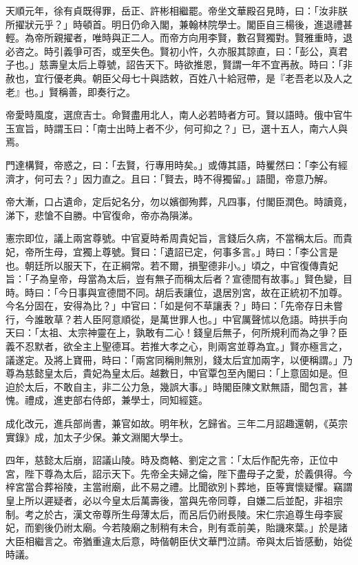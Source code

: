 \begin{pinyinscope}
天順元年，徐有貞既得罪，岳正、許彬相繼罷。帝坐文華殿召見時，曰：「汝非朕所擢狀元乎？」時頓首。明日仍命入閣，兼翰林院學士。閣臣自三楊後，進退禮甚輕。為帝所親擢者，唯時與正二人。而帝方向用李賢，數召賢獨對。賢雅重時，退必咨之。時引義爭可否，或至失色。賢初小忤，久亦服其諒直，曰：「彭公，真君子也。」慈壽皇太后上尊號，詔告天下。時欲推恩，賢謂一年不宜再赦。時曰：「非赦也，宜行優老典。朝臣父母七十與誥敕，百姓八十給冠帶，是『老吾老以及人之老』也。」賢稱善，即奏行之。

帝愛時風度，選庶吉士。命賢盡用北人，南人必若時者方可。賢以語時。俄中官牛玉宣旨，時謂玉曰：「南士出時上者不少，何可抑之？」已，選十五人，南六人與焉。

門達構賢，帝惑之，曰：「去賢，行專用時矣。」或傳其語，時矍然曰：「李公有經濟才，何可去？」因力直之。且曰：「賢去，時不得獨留。」語聞，帝意乃解。

帝大漸，口占遺命，定后妃名分，勿以嬪御殉葬，凡四事，付閣臣潤色。時讀竟，涕下，悲愴不自勝。中官復命，帝亦為隕涕。

憲宗即位，議上兩宮尊號。中官夏時希周貴妃旨，言錢后久病，不當稱太后。而貴妃，帝所生母，宜獨上尊號。賢曰：「遺詔已定，何事多言。」時曰：「李公言是也。朝廷所以服天下，在正綱常。若不爾，損聖德非小。」頃之，中官復傳貴妃旨：「子為皇帝，母當為太后，豈有無子而稱太后者？宣德間有故事。」賢色變，目時。時曰：「今日事與宣德間不同。胡后表讓位，退居別宮，故在正統初不加尊。今名分固在，安得為比？」中官曰：「如是何不草讓表？」時曰：「先帝存日未嘗行，今誰敢草？若人臣阿意順從，是萬世罪人也。」中官厲聲怵以危語。時拱手向天曰：「太祖、太宗神靈在上，孰敢有二心！錢皇后無子，何所規利而為之爭？臣義不忍默者，欲全主上聖德耳。若推大孝之心，則兩宮並尊為宜。」賢亦極言之，議遂定。及將上寶冊，時曰：「兩宮同稱則無別，錢太后宜加兩字，以便稱謂。」乃尊為慈懿皇太后，貴妃為皇太后。越數日，中官覃包至內閣曰：「上意固如是。但迫於太后，不敢自主，非二公力急，幾誤大事。」時閣臣陳文默無語，聞包言，甚愧。禮成，進吏部右侍郎，兼學士，同知經筵。

成化改元，進兵部尚書，兼官如故。明年秋，乞歸省。三年二月詔趣還朝，《英宗實錄》成，加太子少保。兼文淵閣大學士。

四年，慈懿太后崩，詔議山陵。時及商輅、劉定之言：「太后作配先帝，正位中宮，陛下尊為太后，詔示天下。先帝全夫婦之倫，陛下盡母子之愛，於義俱得。今梓宮當合葬裕陵，主當祔廟，此不易之禮。比聞欲別卜葬地，臣等實懷疑懼。竊謂皇上所以遲疑者，必以今皇太后萬壽後，當與先帝同尊，自嫌二后並配，非祖宗制。考之於古，漢文帝尊所生母薄太后，而呂后仍祔長陵。宋仁宗追尊生母李宸妃，而劉後仍祔太廟。今若陵廟之制稍有未合，則有乖前美，貽譏來葉。」於是諸大臣相繼言之。帝猶重違太后意，時偕朝臣伏文華門泣請。帝與太后皆感動，始從時議。


\end{pinyinscope}
